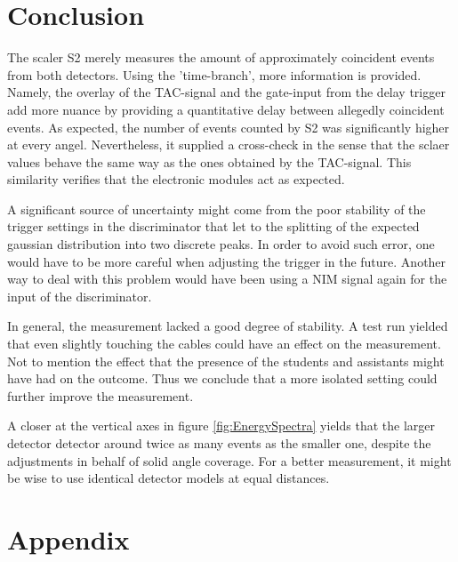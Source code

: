 \documentclass[a4paper,parskip,11pt, DIV12]{scrreprt}
\begin{document}
\chapter{Conclusion}

The scaler S2 merely measures the amount of approximately coincident events from both detectors. Using the 'time-branch', more information is provided. Namely, the overlay of the TAC-signal and the gate-input from the delay trigger add more nuance by providing a quantitative delay between allegedly coincident events. As expected, the number of events counted by S2 was significantly higher at every angel. Nevertheless, it supplied a cross-check in the sense that the sclaer values behave the same way as the ones obtained by the TAC-signal. This similarity verifies that the electronic modules act as expected.

A significant source of uncertainty might come from the poor stability of the trigger settings in the discriminator that let to the splitting of the expected gaussian distribution into two discrete peaks. In order to avoid such error, one would have to be more careful when adjusting the trigger in the future. Another way to deal with this problem would have been using a NIM signal again for the input of the discriminator.

In general, the measurement lacked a good degree of stability. A test run yielded that even slightly touching the cables could have an effect on the measurement. Not to mention the effect that the presence of the students and assistants might have had on the outcome. Thus we conclude that a more isolated setting could further improve the measurement.

A closer at the vertical axes in figure \ref{fig:EnergySpectra} yields that the larger detector detector around twice as many events as the smaller one, despite the adjustments in behalf of solid angle coverage. For a better measurement, it might be wise to use identical detector models at equal distances.



\chapter{Appendix}
\end{document}
